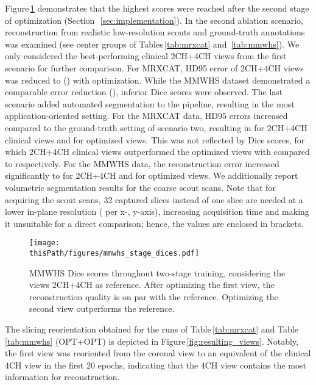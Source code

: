     Figure\,\ref{fig:mmwhs_stage_dices} demonstrates that the highest scores were reached after the second stage of optimization (Section~\,\ref{sec:implementation}).
    In the second ablation scenario, reconstruction from realistic low-resolution scouts and ground-truth annotations was examined (see center groups of Tables\,\ref{tab:mrxcat} and \,\ref{tab:mmwhs}). We only considered the best-performing clinical 2CH+4CH views from the first scenario for further comparison.
    For MRXCAT,  HD95 error of 2CH+4CH views was reduced to  () with optimization.
    While the MMWHS dataset demonstrated a comparable error reduction (), inferior Dice scores were observed.
    The last scenario added automated segmentation to the pipeline, resulting in the most application-oriented setting.
    For the MRXCAT data, HD95 errors increased compared to the ground-truth setting of scenario two, resulting in  for 2CH+4CH clinical views and  for optimized views. This was not reflected by Dice scores, for which 2CH+4CH clinical views outperformed the optimized views with  compared to  respectively.
    For the MMWHS data, the reconstruction error increased significantly to  for 2CH+4CH and  for optimized views.
    We additionally report volumetric segmentation results for the coarse scout scans. Note that for acquiring the scout scans, 32 captured slices instead of one slice are needed at a lower in-plane resolution ( per x-, y-axis), increasing acquisition time and making it unsuitable for a direct comparison; hence, the values are enclosed in brackets.


        \begin{figure}

     \texttt{[image: \\thisPath/figures/mmwhs\_stage\_dices.pdf]}
        \caption{
        MMWHS Dice scores throughout two-stage training, considering the views 2CH+4CH as reference. After optimizing the first view, the reconstruction quality is on par with the reference. Optimizing the second view outperforms the reference.}
        \label{fig:mmwhs_stage_dices}
    \end{figure}

    The slicing reorientation obtained for the runs of Table\,\ref{tab:mrxcat} and Table \,\ref{tab:mmwhs} (OPT+OPT) is depicted in Figure\,\ref{fig:resulting_views}. Notably, the first view was reoriented from the coronal view to an equivalent of the clinical 4CH view in the first 20 epochs, indicating that the 4CH view contains the most information for reconstruction.

